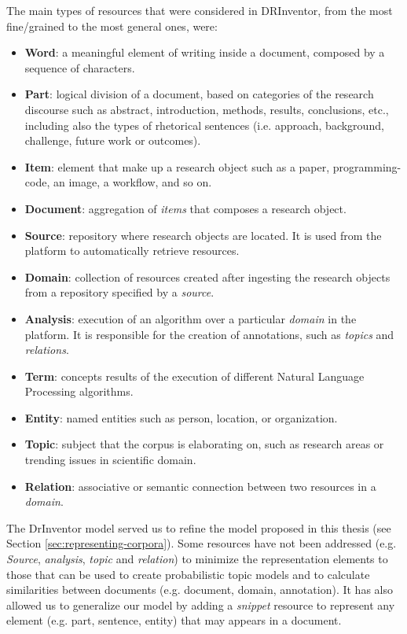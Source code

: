 The main types of resources that were considered in DRInventor, from the most fine/grained to the most general ones, were:
\begin{itemize}
\item \textbf{Word}: a meaningful element of writing inside a document, composed by a sequence of characters.
\item \textbf{Part}: logical division of a document, based on categories of the research discourse such as abstract, introduction, methods, results, conclusions, etc., including also the types of rhetorical sentences \citep{Ronzano2015} (i.e. approach, background, challenge, future work or outcomes).
\item \textbf{Item}: element that make up a research object such as a paper, programming-code, an image, a workflow, and so on.
\item \textbf{Document}: aggregation of \textit{items} that composes a research object.
\item \textbf{Source}: repository where research objects are located. It is used from the platform to automatically retrieve resources.
\item \textbf{Domain}: collection of resources created after ingesting the research objects from a repository specified by a \textit{source}.
\item \textbf{Analysis}: execution of an algorithm over a particular \textit{domain} in the platform. It is responsible for the creation of annotations, such as \textit{topics} and \textit{relations}.
\item \textbf{Term}: concepts results of the execution of different Natural Language Processing algorithms.
\item \textbf{Entity}: named entities such as person, location, or organization.
\item \textbf{Topic}: subject that the corpus is elaborating on, such as research areas or trending issues in scientific domain.
\item \textbf{Relation}: associative or semantic connection between two resources in a \textit{domain}.
\end{itemize}

The DrInventor model served us to refine the model proposed in this thesis (see Section \ref{sec:representing-corpora}). Some resources have not been addressed (e.g. \textit{Source}, \textit{analysis}, \textit{topic} and \textit{relation}) to minimize the representation elements to those that can be used to create probabilistic topic models and to calculate similarities between documents (e.g. document, domain, annotation). It has also allowed us to generalize our model by adding a \textit{snippet} resource to represent any element (e.g. part, sentence, entity) that may appears in a document.


